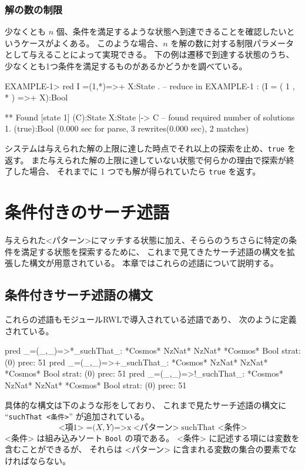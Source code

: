 \documentclass{article}
\begin{document}
\subsubsection{解の数の制限}
少なくとも $n$ 個、条件を満足するような状態へ到達できることを確認したいというケースがよくある。
このような場合、$n$ を解の数に対する制限パラメータとして与えることによって実現できる。
下の例は遷移で到達する状態のうち、少なくとも1つ条件を満足するものがあるかどうかを調べている。
\begin{simplev}
EXAMPLE-1> red I =(1,*)=>+ X:State .
-- reduce in EXAMPLE-1 : (I = ( 1 , * ) =>+ X):Bool

** Found [state 1] (C):State
   { X:State |-> C }
-- found required number of solutions 1.
(true):Bool
(0.000 sec for parse, 3 rewrites(0.000 sec), 2 matches)
\end{simplev}
システムは与えられた解の上限に達した時点でそれ以上の探索を止め、\texttt{true} を返す。
また与えられた解の上限に達していない状態で何らかの理由で探索が終了した場合、
それまでに 1 つでも解が得られていたら \texttt{true} を返す。



\section{条件付きのサーチ述語}
\label{sec:conditional-search}
与えられた<パターン>にマッチする状態に加え、そららのうちさらに特定の条件を満足する状態を探索するために、
これまで見てきたサーチ述語の構文を拡張した構文が用意されている。
本章ではこれらの述語について説明する。

\subsection{条件付きサーチ述語の構文}
これらの述語もモジュールRWLで導入されている述語であり、
次のように定義されている。
\begin{simplev}
 pred _=(_,_)=>*_suchThat_: *Cosmos* NzNat* NzNat* *Cosmos* Bool { strat: (0) prec: 51 }
 pred _=(_,_)=>+_suchThat_: *Cosmos* NzNat* NzNat* *Cosmos* Bool { strat: (0) prec: 51 }
 pred _=(_,_)=>!_suchThat_: *Cosmos* NzNat* NzNat* *Cosmos* Bool { strat: (0) prec: 51 }
\end{simplev}
具体的な構文は下のような形をしており、
これまで見たサーチ述語の構文に ``\texttt{suchThat <条件>}'' が追加されている。
\[\mbox{<項1>}\;\mbox{=(} X, Y \mbox{)=>x}\; \mbox{<パターン>}\;\mbox{suchThat <条件>} \]
<条件> は組み込みソート \texttt{Bool} の項である。
<条件> に記述する項には変数を含むことができるが、
それらは <パターン> に含まれる変数の集合の要素でなければならない。
\end{document}
